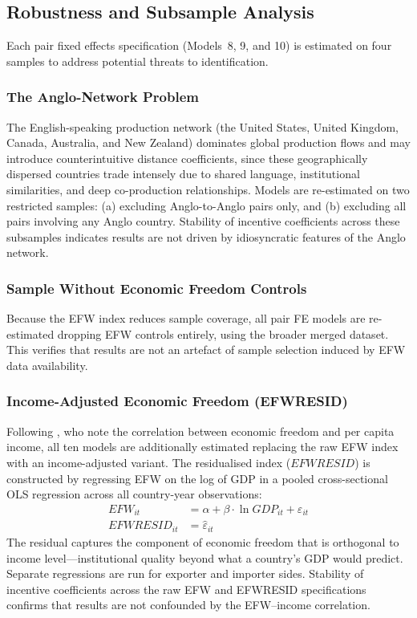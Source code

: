 \subsection{Robustness and Subsample Analysis}
\label{sec:robustness}

Each pair fixed effects specification (Models~8, 9, and 10) is estimated on four samples to address potential threats to identification.

\subsubsection{The Anglo-Network Problem}

The English-speaking production network (the United States, United Kingdom, Canada, Australia, and New Zealand) dominates global production flows and may introduce counterintuitive distance coefficients, since these geographically dispersed countries trade intensely due to shared language, institutional similarities, and deep co-production relationships. Models are re-estimated on two restricted samples: (a) excluding Anglo-to-Anglo pairs only, and (b) excluding all pairs involving any Anglo country. Stability of incentive coefficients across these subsamples indicates results are not driven by idiosyncratic features of the Anglo network.

\subsubsection{Sample Without Economic Freedom Controls}

Because the EFW index reduces sample coverage, all pair FE models are re-estimated dropping EFW controls entirely, using the broader merged dataset. This verifies that results are not an artefact of sample selection induced by EFW data availability.

\subsubsection{Income-Adjusted Economic Freedom (EFWRESID)}

Following \citet{kimura2006}, who note the correlation between economic freedom and per capita income, all ten models are additionally estimated replacing the raw EFW index with an income-adjusted variant. The residualised index ($EFWRESID$) is constructed by regressing EFW on the log of GDP in a pooled cross-sectional OLS regression across all country-year observations:
\begin{align}
EFW_{it} &= \alpha + \beta \cdot \ln GDP_{it} + \varepsilon_{it} \label{eq:efw_reg} \\
EFWRESID_{it} &= \hat{\varepsilon}_{it} \label{eq:efwresid}
\end{align}
The residual captures the component of economic freedom that is orthogonal to income level---institutional quality beyond what a country's GDP would predict. Separate regressions are run for exporter and importer sides. Stability of incentive coefficients across the raw EFW and EFWRESID specifications confirms that results are not confounded by the EFW--income correlation.

